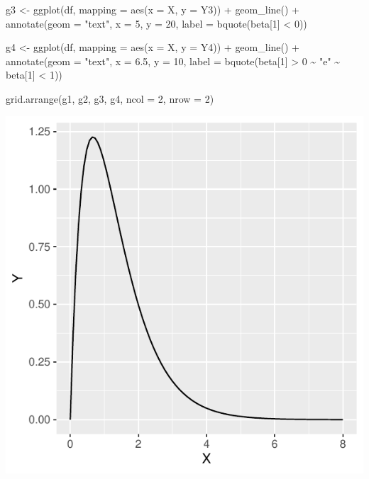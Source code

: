 \documentclass[
]{book}
\newenvironment{Shaded}{\begin{snugshade}}{\end{snugshade}}
\newcommand{\AttributeTok}[1]{\textcolor[rgb]{0.77,0.63,0.00}{#1}}
\newcommand{\DecValTok}[1]{\textcolor[rgb]{0.00,0.00,0.81}{#1}}
\newcommand{\FloatTok}[1]{\textcolor[rgb]{0.00,0.00,0.81}{#1}}
\newcommand{\FunctionTok}[1]{\textcolor[rgb]{0.00,0.00,0.00}{#1}}
\newcommand{\NormalTok}[1]{#1}
\newcommand{\OtherTok}[1]{\textcolor[rgb]{0.56,0.35,0.01}{#1}}
\newcommand{\SpecialCharTok}[1]{\textcolor[rgb]{0.00,0.00,0.00}{#1}}
\newcommand{\StringTok}[1]{\textcolor[rgb]{0.31,0.60,0.02}{#1}}
\begin{document}
\begin{Shaded}
\begin{Highlighting}[]
\NormalTok{g3 }\OtherTok{\textless{}{-}} \FunctionTok{ggplot}\NormalTok{(df, }\AttributeTok{mapping =} \FunctionTok{aes}\NormalTok{(}\AttributeTok{x =}\NormalTok{ X, }\AttributeTok{y =}\NormalTok{ Y3)) }\SpecialCharTok{+}
  \FunctionTok{geom\_line}\NormalTok{() }\SpecialCharTok{+}
  \FunctionTok{annotate}\NormalTok{(}\AttributeTok{geom =} \StringTok{"text"}\NormalTok{, }\AttributeTok{x =} \DecValTok{5}\NormalTok{, }\AttributeTok{y =} \DecValTok{20}\NormalTok{, }
           \AttributeTok{label =} \FunctionTok{bquote}\NormalTok{(beta[}\DecValTok{1}\NormalTok{] }\SpecialCharTok{\textless{}} \DecValTok{0}\NormalTok{))}

\NormalTok{g4 }\OtherTok{\textless{}{-}} \FunctionTok{ggplot}\NormalTok{(df, }\AttributeTok{mapping =} \FunctionTok{aes}\NormalTok{(}\AttributeTok{x =}\NormalTok{ X, }\AttributeTok{y =}\NormalTok{ Y4)) }\SpecialCharTok{+}
  \FunctionTok{geom\_line}\NormalTok{() }\SpecialCharTok{+}
  \FunctionTok{annotate}\NormalTok{(}\AttributeTok{geom =} \StringTok{"text"}\NormalTok{, }\AttributeTok{x =} \FloatTok{6.5}\NormalTok{, }\AttributeTok{y =} \DecValTok{10}\NormalTok{, }
           \AttributeTok{label =} \FunctionTok{bquote}\NormalTok{(beta[}\DecValTok{1}\NormalTok{] }\SpecialCharTok{\textgreater{}} \DecValTok{0} \SpecialCharTok{\textasciitilde{}} \StringTok{"e"} \SpecialCharTok{\textasciitilde{}}\NormalTok{ beta[}\DecValTok{1}\NormalTok{] }\SpecialCharTok{\textless{}} \DecValTok{1}\NormalTok{))}

\FunctionTok{grid.arrange}\NormalTok{(g1, g2, g3, g4, }\AttributeTok{ncol =} \DecValTok{2}\NormalTok{, }\AttributeTok{nrow =} \DecValTok{2}\NormalTok{)}
\end{Highlighting}
\end{Shaded}

\begin{center}\includegraphics{probest-cambientais_files/figure-latex/unnamed-chunk-224-1} \end{center}
\end{document}
